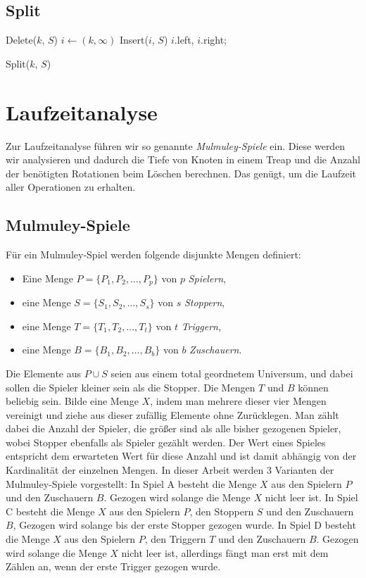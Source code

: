 \documentclass[a4paper]{scrreprt}
\theoremstyle{definition}
\begin{document}
\subsection{Split}
\label{sec:split}

\begin{algorithm}[H]
		Delete($k$, $S$) 
		$i \gets (k, \infty)$ \;
		Insert($i$, $S$) \;
		\Return $i$.left, $i$.right;
	\caption{Split($k$, $S$)}
\end{algorithm}

\section{Laufzeitanalyse}
\label{sec:runtime}
Zur Laufzeitanalyse führen wir so genannte \emph{Mulmuley-Spiele} ein.
Diese werden wir analysieren und dadurch die Tiefe von Knoten in einem Treap und die Anzahl der benötigten Rotationen beim Löschen berechnen.
Das genügt, um die Laufzeit aller Operationen zu erhalten.

\subsection{Mulmuley-Spiele}
\label{sec:mulmuley}
Für ein Mulmuley-Spiel werden folgende disjunkte Mengen definiert: %
\begin{itemize}
    \item Eine Menge $P = \{P_1, P_2, \dots, P_p\}$ von $p$ \emph{Spielern},
    \item eine Menge $S = \{S_1, S_2, \dots, S_s\}$ von $s$ \emph{Stoppern},
    \item eine Menge $T = \{T_1, T_2, \dots, T_t\}$ von $t$ \emph{Triggern},
    \item eine Menge $B = \{B_1, B_2, \dots, B_b\}$ von $b$ \emph{Zuschauern}.
\end{itemize}
Die Elemente aus $P \cup S$ seien aus einem total geordnetem Universum, und dabei sollen die Spieler kleiner sein als die Stopper.
Die Mengen $T$ und $B$ können beliebig sein.
Bilde eine Menge $X$, indem man mehrere dieser vier Mengen vereinigt und ziehe aus dieser zufällig Elemente ohne Zurücklegen.
Man zählt dabei die Anzahl der Spieler, die größer sind als alle bisher gezogenen Spieler, wobei Stopper ebenfalls als Spieler gezählt werden.
Der Wert eines Spieles entspricht dem erwarteten Wert für diese Anzahl und ist damit abhängig von der Kardinalität der einzelnen Mengen.
In dieser Arbeit werden 3 Varianten der Mulmuley-Spiele vorgestellt:
In Spiel A besteht die Menge $X$ aus den Spielern $P$ und den Zuschauern $B$.
Gezogen wird solange die Menge $X$ nicht leer ist.
In Spiel C besteht die Menge $X$ aus den Spielern $P$, den Stoppern $S$ und den Zuschauern $B$,
Gezogen wird solange bis der erste Stopper gezogen wurde.
In Spiel D besteht die Menge $X$ aus den Spielern $P$, den Triggern $T$ und den Zuschauern $B$.
Gezogen wird solange die Menge $X$ nicht leer ist, allerdings fängt man erst mit dem Zählen an, wenn der erste Trigger gezogen wurde.
\end{document}
